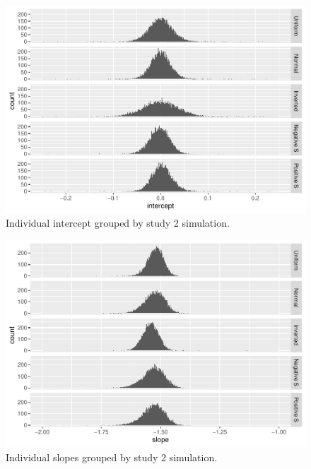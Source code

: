 \documentclass[
  jou]{apa6}
\begin{document}
\begin{figure}
\centering
\includegraphics{ICC_project_files/figure-latex/stackedplotIntercept-1.pdf}
\caption{\label{fig:stackedplotIntercept}Individual intercept grouped by study 2 simulation.}
\end{figure}

\begin{figure}
\centering
\includegraphics{ICC_project_files/figure-latex/stackeplotSlope-1.pdf}
\caption{\label{fig:stackeplotSlope}Individual slopes grouped by study 2 simulation.}
\end{figure}
\end{document}

